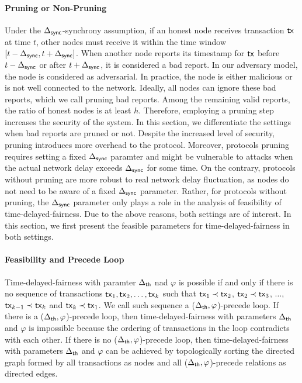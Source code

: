 \paragraph{Pruning or Non-Pruning} Under the $\Delta_{\mathsf{sync}}$-synchrony assumption, if an honest node receives transaction $\mathsf{tx}$ at time $t$, other nodes must receive it within the time window $[t-\Delta_{\mathsf{sync}}, t+\Delta_{\mathsf{sync}}]$. When another node reports its timestamp for $\mathsf{tx}$ before $t-\Delta_{\mathsf{sync}}$ or after $t+\Delta_{\mathsf{sync}}$, it is considered a bad report. In our adversary model, the node is considered as adversarial. In practice, the node is either malicious or is not well connected to the network. Ideally, all nodes can ignore these bad reports, which we call pruning bad reports. Among the remaining valid reports, the ratio of honest nodes is at least $h$. Therefore, employing a pruning step increases the security of the system. In this section, we differentiate the settings when bad reports are pruned or not. Despite the increased level of security, pruning introduces more overhead to the protocol. Moreover, protocols pruning requires setting a fixed $\Delta_{\mathsf{sync}}$ paramter and might be vulnerable to attacks when the actual network delay exceeds $\Delta_{\mathsf{sync}}$ for some time. On the contrary, protocols without pruning are more robust to real network delay fluctuation, as nodes do not need to be aware of a fixed $\Delta_{\mathsf{sync}}$ parameter. Rather, for protocols without pruning, the $\Delta_{\mathsf{sync}}$ parameter only plays a role in the analysis of feasibility of time-delayed-fairness. Due to the above reasons, both settings are of interest. In this section, we first present the feasible parameters for time-delayed-fairness in both settings. 

\paragraph{Feasibility and Precede Loop} Time-delayed-fairness with paramter $\Delta_{\mathsf{th}}$ nad $\varphi$ is possible if and only if there is no sequence of transactions $\mathsf{tx}_1, \mathsf{tx}_2, \ldots, \mathsf{tx}_k$ such that $\mathsf{tx}_1\prec \mathsf{tx}_2$, $\mathsf{tx}_2\prec \mathsf{tx}_3$, $\ldots$, $\mathsf{tx}_{k-1}\prec \mathsf{tx}_k$ and $\mathsf{tx}_k\prec \mathsf{tx}_1$. We call such sequence a ($\Delta_{\mathsf{th}}, \varphi$)-precede loop. If there is a ($\Delta_{\mathsf{th}}, \varphi$)-precede loop, then time-delayed-fairness with parameters $\Delta_{\mathsf{th}}$ and $\varphi$ is impossible because the ordering of transactions in the loop contradicts with each other. If there is no ($\Delta_{\mathsf{th}}, \varphi$)-precede loop, then time-delayed-fairness with parameters $\Delta_{\mathsf{th}}$ and $\varphi$ can be achieved by topologically sorting the directed graph formed by all transactions as nodes and all ($\Delta_{\mathsf{th}}, \varphi$)-precede relations as directed edges. 

